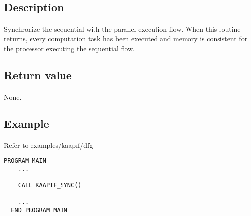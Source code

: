 \documentclass[a4paper, 11pt]{article}
\begin{document}
\subsection{Description}
\paragraph{}
Synchronize the sequential with the parallel execution flow. When this routine
returns, every computation task has been executed and memory is consistent for
the processor executing the sequential flow.

\subsection{Return value}
\paragraph{}
None.

\subsection{Example}
\paragraph{}
Refer to examples/kaapif/dfg\\
\begin{small}
\begin{lstlisting}[frame=tb]
  PROGRAM MAIN
    ...

    CALL KAAPIF_SYNC()

    ...
  END PROGRAM MAIN
\end{lstlisting}
\end{small}
\end{document}
